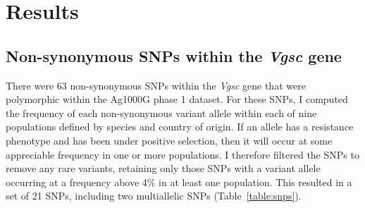 \documentclass[a4paper,11pt,abstracton,hidelinks]{scrartcl}
\begin{document}
\section{Results}\label{sec:results}


\subsection{Non-synonymous SNPs within the \textit{Vgsc} gene}\label{subsec:results-snps}


There were 63 non-synonymous SNPs within the \textit{Vgsc} gene that were polymorphic within the Ag1000G phase 1 dataset.
%
For these SNPs, I computed the frequency of each non-synonymous variant allele within each of nine populations defined by species and country of origin.
%
If an allele has a resistance phenotype and has been under positive selection, then it will occur at some appreciable frequency in one or more populations.
%
I therefore filtered the SNPs to remove any rare variants, retaining only those SNPs with a variant allele occurring at a frequency above 4\% in at least one population.
%
This resulted in a set of 21 SNPs, including two multiallelic SNPs (Table~\ref{table:snps}).
\end{document}
